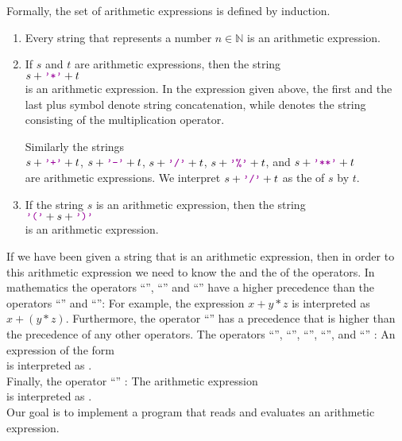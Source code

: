 Formally, the set of arithmetic expressions is defined by induction.
\begin{enumerate}
\item Every string that represents a number $n \in \mathbb{N}$ is an arithmetic expression.
\item If $s$ and $t$ are arithmetic expressions, then the string
      \\[0.2cm]
      \hspace*{1.3cm}
      $s+\mytt{'*'}+t$
      \\[0.2cm]
      is an arithmetic expression.  In the expression given above, the first and the last plus symbol
      denote string concatenation, while  denotes the string consisting of the multiplication
      operator. 

      Similarly the strings  
      \\[0.2cm]
      \hspace*{1.3cm}
      $s + \mytt{'+'} + t$, \quad $s + \mytt{'-'} + t$, \quad
      $s + \mytt{'/'} + t$, \quad $s + \mytt{'\symbol{37}'} + t$, \quad and \quad $s +\mytt{'**'} + t$
      \\[0.2cm]
      are arithmetic expressions.  We interpret  $s + \mytt{'/'} + t$ as the  of $s$
      by $t$.
\item If the string $s$ is an arithmetic expression, then the string
      \\[0.2cm]
      \hspace*{1.3cm}
      $\mytt{'('}+ s + \mytt{')'}$ 
      \\[0.2cm]
      is an arithmetic expression.
\end{enumerate}
If we have been given a string that is an arithmetic expression, then in order to  this
arithmetic expression we need to know the  and the
 of the operators.
In mathematics the operators ``\mytt{*}'', ``\mytt{/}'' and ``'' have a
higher precedence than the operators ``\mytt{+}'' and ``\mytt{-}'':  For example, the expression
$x+y*z$ is interpreted as $x + (y * z)$.
 Furthermore, the operator
  ``\mytt{**}'' has a precedence that is higher than the precedence
 of any other operators.  The operators
``\mytt{+}'', ``\mytt{-}'', ``\mytt{*}'', ``\mytt{/}'', and ``''
:  An expression of the form 
\\[0.2cm]
\hspace*{1.3cm} 
 \quad is interpreted as \quad {}.
 \\[0.2cm]
Finally, the operator ``\mytt{**}'' :
The arithmetic expression \\[0.2cm]
\hspace*{1.3cm} 
 \quad is interpreted as \quad 
{}. 
\\[0.2cm]
Our goal is to implement a program that reads and evaluates an arithmetic expression.


